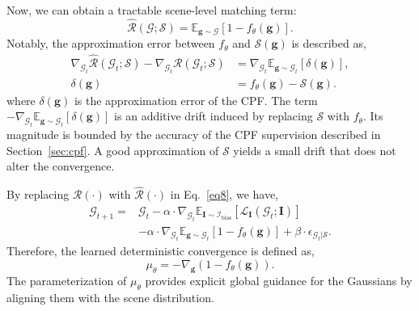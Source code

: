 \documentclass[lettersize,journal]{IEEEtran}
\begin{document}
Now, we can obtain a tractable scene-level matching term:
\begin{equation}
    \widehat{\mathcal{R}}(\mathcal{G};\mathcal{S}) = \mathbb{E}_{\mathbf{g} \sim \mathcal{G}} \left[ 1 - f_{\theta} (\mathbf{g}) \right].
    \label{eq11}
\end{equation}
Notably, the approximation error between $f_{\theta}$ and $\mathcal{S}(\mathbf{g})$ is described as, 
\begin{equation}
    \begin{aligned}
    \nabla_{\mathcal{G}_t} \widehat{\mathcal{R}}(\mathcal{G}_t;\mathcal{S}) - \nabla_{\mathcal{G}_t} \mathcal{R}(\mathcal{G}_t;\mathcal{S}) &= \nabla_{\mathcal{G}_t} \mathbb{E}_{\mathbf{g} \sim \mathcal{G}_t} \left[ \delta(\mathbf{g}) \right], \\
    \delta(\mathbf{g}) &= f_{\theta} (\mathbf{g}) - \mathcal{S} (\mathbf{g}).
    \end{aligned}
    \label{eq12}
\end{equation}
{\color{blue}where $\delta(\mathbf{g})$ is the approximation error of the CPF. The term $-\nabla_{\mathcal{G}_t} \mathbb{E}_{\mathbf{g} \sim \mathcal{G}_t} \left[ \delta(\mathbf{g}) \right]$ is an additive drift induced by replacing $\mathcal{S}$ with $f_{\theta}$. Its magnitude is bounded by the accuracy of the CPF supervision described in Section~\ref{sec:cpf}. A good approximation of $\mathcal{S}$ yields a small drift that does not alter the convergence.}

By replacing $\mathcal{R}(\cdot)$ with $\widehat{\mathcal{R}}(\cdot)$ in Eq.~\ref{eq8}, we have, 
\begin{equation}
    \begin{aligned}
    \mathcal{G}_{t+1} = &\mathcal{G}_t - \alpha \cdot \nabla_{\mathcal{G}_t} \mathbb{E}_{\mathbf{I}\sim\mathcal{I}_{\text{bias}}}\!\left[\mathcal{L}_{\mathbf{I}}(\mathcal{G}_t;\mathbf{I})\right] \\
    &- \alpha \cdot \nabla_{\mathcal{G}_t} \mathbb{E}_{\mathbf{g} \sim \mathcal{G}_t} \left[ 1 - f_{\theta}( \mathbf{g} ) \right] + \beta \cdot \epsilon_{\mathcal{G}_t \vert \mathcal{S}}.
    \end{aligned}
    \label{eq13}
\end{equation}
Therefore, the learned deterministic convergence is defined as, 
\begin{equation}
    \mu_{\theta} = -  \nabla_{\mathbf{g}}  (1 - f_{\theta}(\mathbf{g})).
    \label{eq13.1}
\end{equation}
The parameterization of $\mu_{\theta}$ provides explicit global guidance 
for the Gaussians by aligning them with the scene distribution.
\end{document}
